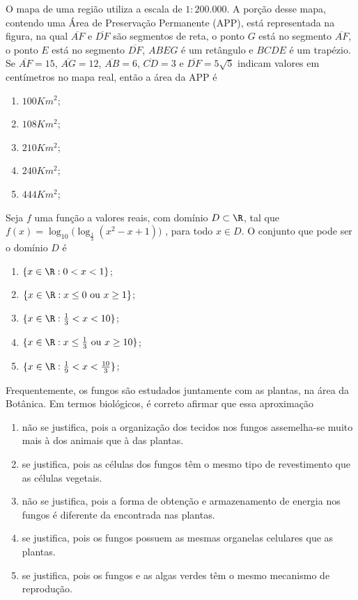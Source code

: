 \documentclass[twocolumn,landscape]{amsart}
\begin{document}
\begin{questao}
  O mapa de uma região utiliza a escala de $1:200.000$. A porção desse
  mapa, contendo uma Área de Preservação Permanente (APP), está
  representada na figura, na qual $\overline{AF}$ e $\overline{DF}$ são
  segmentos de reta, o ponto $G$ está no segmento $\overline{AF}$, o
  ponto $E$ está no segmento $\overline{DF}$, $ABEG$ é um retângulo e
  $BCDE$ é um trapézio. Se $\overline{AF}=15$, $\overline{AG}=12$,
  $\overline{AB}=6$, $\overline{CD}=3$ e $\overline{DF}=5\sqrt{5}$
  indicam valores em centímetros no mapa real, então a área da APP é
  \begin{enumerate}[\bf a.]
    \item $100 Km^2$;
    \item $108 Km^2$;
    \item $210 Km^2$;
    \item $240 Km^2$;
    \item $444 Km^2$; %
  \end{enumerate}
\end{questao}
\clearpage

\begin{questao}
  Seja $f$ uma função a valores reais, com domínio $D\subset\R$, tal que
  $f(x)=\log_{10}\big(\log_{\frac{1}{3}}(x^2-x+1)\big)$ , para todo
  $x\in D$. O conjunto que pode ser o domínio $D$ é
  \begin{enumerate}[\bf a.]
    \item $\{x\in\R: 0<x<1\}$; %
    \item $\{x\in\R: x\leq 0\mbox{ ou } x\geq 1\}$;
    \item $\{x\in\R: \frac{1}{3}<x<10\}$;
    \item $\{x\in\R: x\leq \frac{1}{3}\mbox{ ou } x\geq 10\}$;
    \item $\{x\in\R: \frac{1}{9}<x<\frac{10}{3}\}$;
  \end{enumerate}
\end{questao}
\clearpage

\begin{questao}
  Frequentemente, os fungos são estudados juntamente com as plantas, na
  área da Botânica. Em termos biológicos, é correto afirmar que essa
  aproximação
  \begin{enumerate}[\bf a.]
    \item não se justifica, pois a organização dos tecidos nos fungos
    assemelha-se muito mais à dos animais que à das plantas.
    \item se justifica, pois as células dos fungos têm o mesmo tipo de
    revestimento que as células vegetais.
    \item não se justifica, pois a forma de obtenção e armazenamento de
    energia nos fungos é diferente da encontrada nas plantas. %
    \item se justifica, pois os fungos possuem as mesmas organelas
    celulares que as plantas.
    \item se justifica, pois os fungos e as algas verdes têm o mesmo
    mecanismo de reprodução.
  \end{enumerate}
\end{questao}
\clearpage
\end{document}
